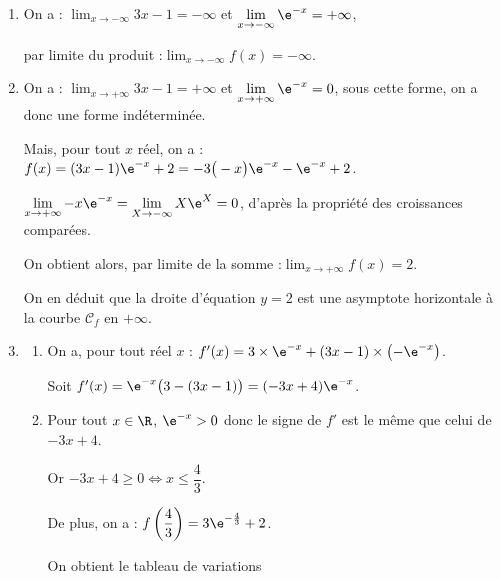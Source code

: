 \begin{enumerate}
		\item On a :\quad
		$\displaystyle \lim_{x \to -\infty} 3x-1 = - \infty$
		\quad et \quad
		$\displaystyle \lim_{x \to -\infty} \e^{-x} = + \infty$,

		par limite du produit :\quad $\displaystyle \lim_{x \to -\infty} f(x) = - \infty$.

		\item On a :\quad
		$\displaystyle \lim_{x \to +\infty} 3x-1 = + \infty$
		\quad et \quad
		$\displaystyle \lim_{x \to +\infty} \e^{-x} = 0$, \quad sous cette forme, on a donc une forme indéterminée.

		Mais, pour tout $x$ réel, on a :\quad $f(x) = (3x- 1)\e^{-x} +2 =  -3 \big(-x \big)\e^{-x} - \e^{-x} +2$.


		$\displaystyle  \lim_{x \to +\infty} -x \e^{-x} = \displaystyle  \lim_{X \to -\infty} X \e^{X} = 0  $, \quad d'après la propriété des croissances comparées.

		On obtient alors, par limite de la somme :\quad $\displaystyle  \lim_{x \to +\infty} f(x) =2$.

		On en déduit que la droite d'équation $y=2$ est une asymptote horizontale à la courbe $\mathcal{C}_f$ en $+\infty$.

		\item \begin{enumerate}
			\item On a, pour tout réel $x$ : \quad $f'(x)=3 \times \e^{-x} + (3x-1) \times \left( - \e^{-x} \right)$.

			Soit \quad $f'(x)=\e^{-x} \big( 3-(3x-1) \big)=(-3x+4) \e^{-x}$.

			\item Pour tout $x \in \R$, \quad $\e^{-x} >0$ \quad donc le signe de $f'$ est le même que celui de $-3x+4$.

			Or \quad $-3x+4 \geqslant 0 \iff x \leqslant \dfrac43$.

			De plus, on a : \quad $f \left(\dfrac43 \right) = 3 \e^{-\frac43}+2$.

			On obtient le tableau de variations
			\begin{center}
			\end{center}
		\end{enumerate}


\end{enumerate}
